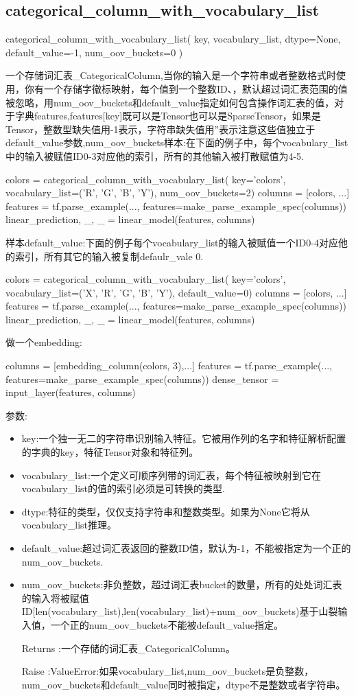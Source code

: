 \subsection{categorical\_column\_with\_vocabulary\_list}
\begin{python}
categorical_column_with_vocabulary_list(
    key,
    vocabulary_list,
    dtype=None,
    default_value=-1,
    num_oov_buckets=0
)
\end{python}
一个存储词汇表\_CategoricalColumn,当你的输入是一个字符串或者整数格式时使用，你有一个存储字徽标映射，每个值到一个整数ID、，默认超过词汇表范围的值被忽略，用num\_oov\_buckets和default\_value指定如何包含操作词汇表的值，对于字典features,features[key]既可以是Tensor也可以是SparseTensor，如果是Tensor，整数型缺失值用-1表示，字符串缺失值用''表示注意这些值独立于default\_value参数,num\_oov\_buckets样本:在下面的例子中，每个vocabulary\_list中的输入被赋值ID0-3对应他的索引，所有的其他输入被打散赋值为4-5.
\begin{python}
colors = categorical_column_with_vocabulary_list(
    key='colors', vocabulary_list=('R', 'G', 'B', 'Y'),
    num_oov_buckets=2)
columns = [colors, ...]
features = tf.parse_example(..., features=make_parse_example_spec(columns))
linear_prediction, _, _ = linear_model(features, columns)
\end{python}
样本default\_value:下面的例子每个vocabulary\_list的输入被赋值一个ID0-4对应他的索引，所有其它的输入被复制defaulr\_vale 0.
\begin{python}
colors = categorical_column_with_vocabulary_list(
    key='colors', vocabulary_list=('X', 'R', 'G', 'B', 'Y'), default_value=0)
columns = [colors, ...]
features = tf.parse_example(..., features=make_parse_example_spec(columns))
linear_prediction, _, _ = linear_model(features, columns)
\end{python}
做一个embedding:
\begin{python}
columns = [embedding_column(colors, 3),...]
features = tf.parse_example(..., features=make_parse_example_spec(columns))
dense_tensor = input_layer(features, columns)
\end{python}
参数:
\begin{itemize}
	\item key:一个独一无二的字符串识别输入特征。它被用作列的名字和特征解析配置的字典的key，特征Tensor对象和特征列。
	\item vocabulary\_list:一个定义可顺序列带的词汇表，每个特征被映射到它在vocabulary\_list的值的索引必须是可转换的类型.
	\item dtype:特征的类型，仅仅支持字符串和整数类型。如果为None它将从vocabulary\_list推理。
	\item default\_value:超过词汇表返回的整数ID值，默认为-1，不能被指定为一个正的num\_oov\_buckets.
	\item num\_oov\_buckets:非负整数，超过词汇表bucket的数量，所有的处处词汇表的输入将被赋值ID[len(vocabulary\_list),len(vocabulary\_list)+num\_oov\_buckets)基于山裂输入值，一个正的num\_oov\_buckets不能被default\_value指定。
	\item[Returns]:一个存储的词汇表\_CategoricalColumn。
	\item[Raise]:ValueError:如果vocabulary\_list,num\_oov\_buckets是负整数，num\_oov\_buckets和default\_value同时被指定，dtype不是整数或者字符串。
\end{itemize}
